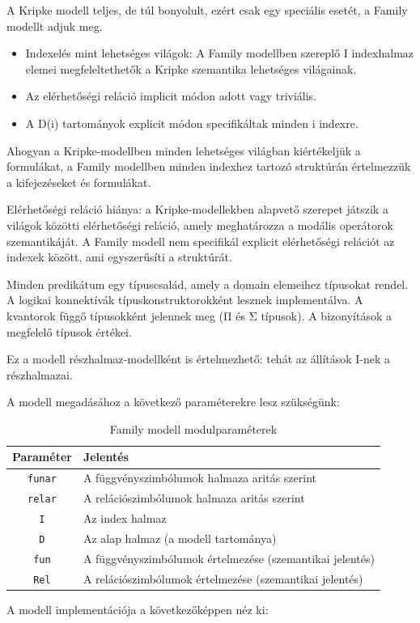 

A Kripke modell teljes, de túl bonyolult, ezért csak egy speciális esetét, a Family modellt adjuk meg.

\begin{itemize}
\item Indexelés mint lehetséges világok: A Family modellben szereplő I indexhalmaz elemei megfeleltethetők a Kripke szemantika lehetséges világainak.
\item Az elérhetőségi reláció implicit módon adott vagy triviális.
\item A D(i) tartományok explicit módon specifikáltak minden i indexre.
\end{itemize}

Ahogyan a Kripke-modellben minden lehetséges világban kiértékeljük a formulákat, a Family modellben minden indexhez tartozó struktúrán értelmezzük a kifejezéseket és formulákat.

Elérhetőségi reláció hiánya: a Kripke-modellekben alapvető szerepet játszik a világok közötti elérhetőségi reláció, amely meghatározza a modális operátorok szemantikáját. A Family modell nem specifikál explicit elérhetőségi relációt az indexek között, ami egyszerűsíti a struktúrát.

Minden predikátum egy típuscsalád, amely a domain elemeihez típusokat rendel. A logikai konnektívák típuskonstruktorokként lesznek implementálva. A kvantorok függő típusokként jelennek meg (Π és Σ típusok). A bizonyítások a megfelelő típusok értékei.

Ez a modell részhalmaz-modellként is értelmezhető: tehát az állítások I-nek a részhalmazai.

A modell megadásához a következő paraméterekre lesz szükségünk:
\fmModuleParams

\begin{table}[H]
\centering
\begin{tabular}{|c|l|}
\hline
\textbf{Paraméter} & \textbf{Jelentés} \\
\hline
\texttt{funar} & A függvényszimbólumok halmaza aritás szerint \\
\hline
\texttt{relar} & A relációszimbólumok halmaza aritás szerint \\
\hline
\texttt{I} & Az index halmaz \\
\hline
\texttt{D} & Az alap halmaz (a modell tartománya) \\
\hline
\texttt{fun} & A függvényszimbólumok értelmezése (szemantikai jelentés) \\
\hline
\texttt{Rel} & A relációszimbólumok értelmezése (szemantikai jelentés) \\
\hline
\end{tabular}
\caption{Family modell modulparaméterek}
\label{tab:family_module_params}
\end{table}

A modell implementációja a következőképpen néz ki:
\fmFamily